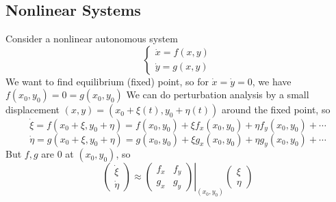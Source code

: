 \subsection{Nonlinear Systems}
Consider a nonlinear autonomous system
$$\begin{cases}
    \dot{x}=f(x,y)\\
    \dot{y}=g(x,y)
\end{cases}$$
We want to find equilibrium (fixed) point, so for $\dot{x}=\dot{y}=0$, we have $f(x_0,y_0)=0=g(x_0,y_0)$
We can do perturbation analysis by a small displacement $(x,y)=(x_0+\xi(t),y_0+\eta(t))$ around the fixed point, so
$$\dot{\xi}=f(x_0+\xi,y_0+\eta)=f(x_0,y_0)+\xi f_x(x_0,y_0)+\eta f_y(x_0,y_0)+\cdots$$
$$\dot{\eta}=g(x_0+\xi,y_0+\eta)=g(x_0,y_0)+\xi g_x(x_0,y_0)+\eta g_y(x_0,y_0)+\cdots$$
But $f,g$ are $0$ at $(x_0,y_0)$, so
$$\begin{pmatrix}
    \dot{\xi}\\
    \dot{\eta}
\end{pmatrix}\approx
\left.\begin{pmatrix}
    f_x&f_y\\
    g_x&g_y
\end{pmatrix}\right|_{(x_0,y_0)}\begin{pmatrix}
    \xi\\
    \eta
\end{pmatrix}$$
